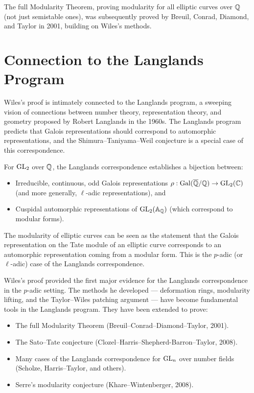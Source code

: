 The full Modularity Theorem, proving modularity for all elliptic curves over \(\mathbb{Q}\) (not just semistable ones), was subsequently proved by Breuil, Conrad, Diamond, and Taylor in 2001, building on Wiles's methods.

\section{Connection to the Langlands Program}

Wiles's proof is intimately connected to the Langlands program, a sweeping vision of connections between number theory, representation theory, and geometry proposed by Robert Langlands in the 1960s. The Langlands program predicts that Galois representations should correspond to automorphic representations, and the Shimura--Taniyama--Weil conjecture is a special case of this correspondence.

For \(\operatorname{GL}_2\) over \(\mathbb{Q}\), the Langlands correspondence establishes a bijection between:
\begin{itemize}
    \item Irreducible, continuous, odd Galois representations \(\rho: \operatorname{Gal}(\overline{\mathbb{Q}}/\mathbb{Q}) \to \operatorname{GL}_2(\mathbb{C})\) (and more generally, \(\ell\)-adic representations), and
    \item Cuspidal automorphic representations of \(\operatorname{GL}_2(\mathbb{A}_{\mathbb{Q}})\) (which correspond to modular forms).
\end{itemize}

The modularity of elliptic curves can be seen as the statement that the Galois representation on the Tate module of an elliptic curve corresponds to an automorphic representation coming from a modular form. This is the \(p\)-adic (or \(\ell\)-adic) case of the Langlands correspondence.

Wiles's proof provided the first major evidence for the Langlands correspondence in the \(p\)-adic setting. The methods he developed --- deformation rings, modularity lifting, and the Taylor--Wiles patching argument --- have become fundamental tools in the Langlands program. They have been extended to prove:
\begin{itemize}
    \item The full Modularity Theorem (Breuil--Conrad--Diamond--Taylor, 2001).
    \item The Sato--Tate conjecture (Clozel--Harris--Shepherd-Barron--Taylor, 2008).
    \item Many cases of the Langlands correspondence for \(\operatorname{GL}_n\) over number fields (Scholze, Harris--Taylor, and others).
    \item Serre's modularity conjecture (Khare--Wintenberger, 2008).
\end{itemize}

